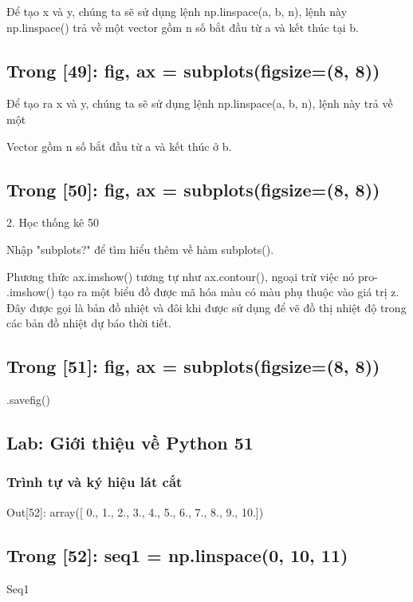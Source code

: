 Để tạo x và y, chúng ta sẽ sử dụng lệnh np.linspace(a, b, n), lệnh này np.linspace() trả về một vector gồm n số bắt đầu từ a và kết thúc tại b.

\subsection{Trong [49]: fig, ax = subplots(figsize=(8, 8))}

Để tạo ra x và y, chúng ta sẽ sử dụng lệnh np.linspace(a, b, n), lệnh này trả về một

Vector gồm n số bắt đầu từ a và kết thúc ở b.

\subsection{Trong [50]: fig, ax = subplots(figsize=(8, 8))}

2. Học thống kê 50

Nhập "subplots?" để tìm hiểu thêm về hàm subplots().

Phương thức ax.imshow() tương tự như ax.contour(), ngoại trừ việc nó pro- .imshow() tạo ra một biểu đồ được mã hóa màu có màu phụ thuộc vào giá trị z. Đây được gọi là bản đồ nhiệt và đôi khi được sử dụng để vẽ đồ thị nhiệt độ trong các bản đồ nhiệt dự báo thời tiết.

\subsection{Trong [51]: fig, ax = subplots(figsize=(8, 8))}

.savefig()

\subsection{Lab: Giới thiệu về Python 51}

\subsubsection{Trình tự và ký hiệu lát cắt}

Out[52]: array([ 0., 1., 2., 3., 4., 5., 6., 7., 8., 9., 10.])

\subsection{Trong [52]: seq1 = np.linspace(0, 10, 11)}

Seq1

